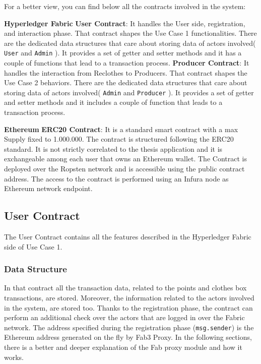 For a better view, you can find below all the contracts involved in the system:
\begin{outline}[enumerate]
    \1 \textbf{Hyperledger Fabric}
    \2 \textbf{User Contract}: It handles the User side, registration, and interaction phase. That contract shapes 
    the Use Case 1 functionalities. There are the dedicated data structures that care about storing data of actors 
    involved( \texttt{User} and \texttt{Admin} ). It provides a set of getter and setter methods and it has a couple 
    of functions that lead to a transaction process.    
    \2 \textbf{Producer Contract}: It handles the interaction from Reclothes to Producers. That contract shapes the 
    Use Case 2 behaviors. There are the dedicated data structures that care about storing data of actors  
    involved( \texttt{Admin} and \texttt{Producer} ). It provides a set of getter and setter methods and it includes 
    a couple of function that leads to a transaction process.  

    \1 \textbf{Ethereum}
    \2 \textbf{ERC20 Contract}: It is a standard smart contract with a max Supply fixed to 1.000.000.
    The contract is structured following the ERC20 standard. It is not strictly correlated to the thesis application and
    it is exchangeable among each user that owns an Ethereum wallet. The Contract is deployed over the Ropsten network 
    and is accessible using the public contract address. The access to the contract is performed using an Infura node 
    as Ethereum network endpoint.
\end{outline}

\subsection{User Contract} 

The User Contract contains all the features described in the Hyperledger Fabric side of Use Case 1. 

\subsubsection{Data Structure}

In that contract all the transaction data, related to the points and clothes box transactions, are stored. Moreover, 
the information related to the actors involved in the system, are stored too. 
Thanks to the registration phase, the contract can perform an additional check over the actors that are logged in 
over the Fabric network. The address specified during the registration phase (\texttt{msg.sender}) is the Ethereum 
address generated on the fly by Fab3 Proxy. In the following sections, there is a better and deeper explanation of 
the Fab proxy module and how it works.  
\bigskip

